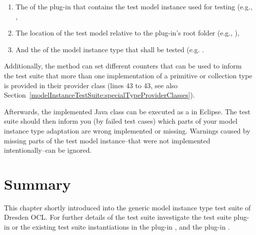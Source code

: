 \begin{enumerate}
	\item The  of the plug-in that contains the test model instance used 
	  for testing (e.g.,
	  ,
	\item The location of the test model relative to the plug-in's root folder 
	  (e.g.,
	  ),
	\item And the  of the model instance type that shall be tested (e.g.
	  .
\end{enumerate}

Additionally, the method can set different counters that can be used to inform
the test suite that more than one implementation of a primitive or collection
type is provided in their provider class (lines 43 to 43, see also 
Section~\ref{modelInstanceTestSuite:specialTypeProviderClasses}).

Afterwards, the implemented Java class can be executed as a  in Eclipse. The test suite should then inform you (by failed test 
cases) which parts of your model instance type adaptation are wrong implemented
or missing. Warnings caused by missing parts of the test model instance--that 
were not implemented intentionally--can be ignored.


\section{Summary}

This chapter shortly introduced into the generic model instance type test suite
of Dresden OCL. For further details of the test suite investigate the test suite
plug-in
or the existing test suite instantiations in the plug-in 
, and the plug-in .

